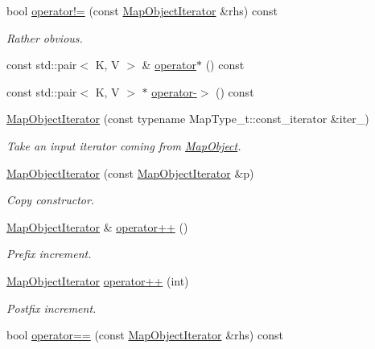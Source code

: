 \begin{DoxyCompactItemize}
bool \mbox{\hyperlink{classADAT_1_1MapObjectIterator_a1110663c46b0e652d8ecd0dbe80bd255}{operator!=}} (const \mbox{\hyperlink{classADAT_1_1MapObjectIterator}{Map\+Object\+Iterator}} \&rhs) const
\begin{DoxyCompactList}\small\item\em Rather obvious. \end{DoxyCompactList}\item 
const std\+::pair$<$ K, V $>$ \& \mbox{\hyperlink{classADAT_1_1MapObjectIterator_a3faecdcae68181e91e40dad404296ed7}{operator$\ast$}} () const
\item 
const std\+::pair$<$ K, V $>$ $\ast$ \mbox{\hyperlink{classADAT_1_1MapObjectIterator_aa56a13020c9fac807f99312923610dbd}{operator-\/$>$}} () const
\item 
\mbox{\hyperlink{classADAT_1_1MapObjectIterator_a2b23220f6791a2793bb16a898a515926}{Map\+Object\+Iterator}} (const typename Map\+Type\+\_\+t\+::const\+\_\+iterator \&iter\+\_\+)
\begin{DoxyCompactList}\small\item\em Take an input iterator coming from \mbox{\hyperlink{classADAT_1_1MapObject}{Map\+Object}}. \end{DoxyCompactList}\item 
\mbox{\hyperlink{classADAT_1_1MapObjectIterator_a62eb4a3a1c1bab1329e51a3d857d4065}{Map\+Object\+Iterator}} (const \mbox{\hyperlink{classADAT_1_1MapObjectIterator}{Map\+Object\+Iterator}} \&p)
\begin{DoxyCompactList}\small\item\em Copy constructor. \end{DoxyCompactList}\item 
\mbox{\hyperlink{classADAT_1_1MapObjectIterator}{Map\+Object\+Iterator}} \& \mbox{\hyperlink{classADAT_1_1MapObjectIterator_a2eedaf3b2fc70d48afd45bd37c5e6e69}{operator++}} ()
\begin{DoxyCompactList}\small\item\em Prefix increment. \end{DoxyCompactList}\item 
\mbox{\hyperlink{classADAT_1_1MapObjectIterator}{Map\+Object\+Iterator}} \mbox{\hyperlink{classADAT_1_1MapObjectIterator_a90809a5488988dd0d49ce25df35756ae}{operator++}} (int)
\begin{DoxyCompactList}\small\item\em Postfix increment. \end{DoxyCompactList}\item 
bool \mbox{\hyperlink{classADAT_1_1MapObjectIterator_a3153929ca4103b625790fb1d09f33e71}{operator==}} (const \mbox{\hyperlink{classADAT_1_1MapObjectIterator}{Map\+Object\+Iterator}} \&rhs) const

\end{DoxyCompactItemize}
